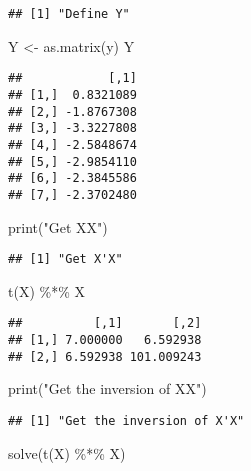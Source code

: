 \documentclass[
]{article}
\newenvironment{Shaded}{\begin{snugshade}}{\end{snugshade}}
\newcommand{\FunctionTok}[1]{\textcolor[rgb]{0.00,0.00,0.00}{#1}}
\newcommand{\NormalTok}[1]{#1}
\newcommand{\OtherTok}[1]{\textcolor[rgb]{0.56,0.35,0.01}{#1}}
\newcommand{\SpecialCharTok}[1]{\textcolor[rgb]{0.00,0.00,0.00}{#1}}
\newcommand{\StringTok}[1]{\textcolor[rgb]{0.31,0.60,0.02}{#1}}
\begin{document}
\begin{verbatim}
## [1] "Define Y"
\end{verbatim}

\begin{Shaded}
\begin{Highlighting}[]
\NormalTok{Y }\OtherTok{\textless{}{-}} \FunctionTok{as.matrix}\NormalTok{(y)}
\NormalTok{Y}
\end{Highlighting}
\end{Shaded}

\begin{verbatim}
##            [,1]
## [1,]  0.8321089
## [2,] -1.8767308
## [3,] -3.3227808
## [4,] -2.5848674
## [5,] -2.9854110
## [6,] -2.3845586
## [7,] -2.3702480
\end{verbatim}

\begin{Shaded}
\begin{Highlighting}[]
\FunctionTok{print}\NormalTok{(}\StringTok{"Get X\textquotesingle{}X"}\NormalTok{)}
\end{Highlighting}
\end{Shaded}

\begin{verbatim}
## [1] "Get X'X"
\end{verbatim}

\begin{Shaded}
\begin{Highlighting}[]
\FunctionTok{t}\NormalTok{(X) }\SpecialCharTok{\%*\%}\NormalTok{ X}
\end{Highlighting}
\end{Shaded}

\begin{verbatim}
##          [,1]       [,2]
## [1,] 7.000000   6.592938
## [2,] 6.592938 101.009243
\end{verbatim}

\begin{Shaded}
\begin{Highlighting}[]
\FunctionTok{print}\NormalTok{(}\StringTok{"Get the inversion of X\textquotesingle{}X"}\NormalTok{)}
\end{Highlighting}
\end{Shaded}

\begin{verbatim}
## [1] "Get the inversion of X'X"
\end{verbatim}

\begin{Shaded}
\begin{Highlighting}[]
\FunctionTok{solve}\NormalTok{(}\FunctionTok{t}\NormalTok{(X) }\SpecialCharTok{\%*\%}\NormalTok{ X)}
\end{Highlighting}
\end{Shaded}
\end{document}
